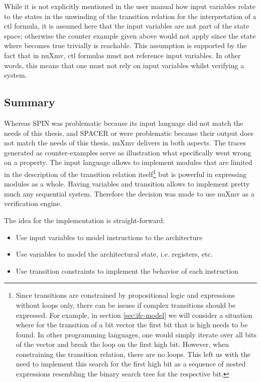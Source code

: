 \begin{example}
    While it is not explicitly mentioned in the user manual how input variables relate to the states in the unwinding of the transition relation for the interpretation of a \gls{ctl} formula, it is assumed here that the input variables are not part of the state space; otherwise the counter example given above would not apply since the state where  becomes true trivially is reachable.
    This assumption is supported by the fact that in nuXmv, \gls{ctl} formulas must not reference input variables.
    In other words, this means that one must not rely on input variables whilst verifying a system.
\end{example}

\subsection{Summary}

Whereas SPIN was problematic because its input language did not match the needs of this thesis, and SPACER or \muZ{} were problematic because their output does not match the needs of this thesis, nuXmv delivers in both aspects.
The traces generated as counter-examples serve as illustration what specifically went wrong on a property.
The input language allows to implement modules that are limited in the description of the transition relation itself\footnote{%
    Since transitions are constrained by propositional logic and expressions without loops only, there can be issues if complex transitions should be expressed.
    For example, in section \ref{sec:ifc-model} we will consider a situation where for the transition of a bit vector the first bit that is high needs to be found.
    In other programming languages, one would simply iterate over all bits of the vector and break the loop on the first high bit.
    However, when constraining the transition relation, there are no loops.
    This left us with the need to implement this search for the first high bit as a sequence of nested  expressions resembling the binary search tree for the respective bit.
} but is powerful in expressing modules as a whole.
Having variables and transition allows to implement pretty much any sequential system.
Therefore the decision was made to use nuXmv as a verification engine.

The idea for the implementation is straight-forward:
\begin{itemize}
    \item Use input variables to model instructions to the architecture
    \item Use variables to model the architectural state, i.e. registers, etc.
    \item Use transition constraints to implement the behavior of each instruction
\end{itemize}

